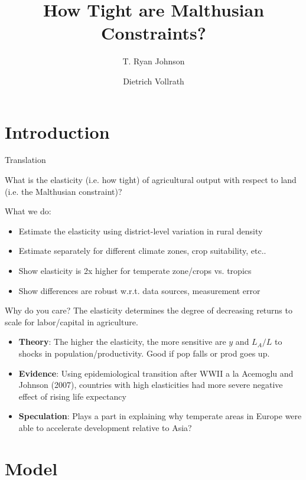 \documentclass[10pt, xcolor=dvipsnames]{beamer}
\title[Land Constraints]{{How Tight are Malthusian Constraints?}}
\author[Johnson \& Vollrath]{T. Ryan Johnson \inst{1} \and Dietrich Vollrath \inst{2}}
\institute[UH]{\inst{1} University of Houston \and %
                      \inst{2} University of Houston}
\date[June 2017]{}
\begin{document}
\maketitle

\section{Introduction}

\begin{frame}{Translation}\label{define}

What is the elasticity (i.e. how tight) of agricultural output with respect to land (i.e. the Malthusian constraint)? 

What we do: 
\begin{itemize}
  \item Estimate the elasticity using district-level variation in rural density
  \item Estimate separately for different climate zones, crop suitability, etc..
  \item Show elasticity is 2x higher for temperate zone/crops vs. tropics
  \item Show differences are robust w.r.t. data sources, measurement error
\end{itemize}


\end{frame}


\begin{frame}{Why do you care?}
The elasticity determines the degree of decreasing returns to scale for labor/capital in agriculture. 

\begin{itemize}
  \item \textbf{Theory}: The higher the elasticity, the more sensitive are $y$ and $L_A/L$ to shocks in population/productivity. Good if pop falls or prod goes up.
  \item \textbf{Evidence}: Using epidemiological transition after WWII a la Acemoglu and Johnson (2007), countries with high elasticities had more severe negative effect of rising life expectancy
  \item \textbf{Speculation}: Plays a part in explaining why temperate areas in Europe were able to accelerate development relative to Asia? 

\end{itemize}

\end{frame}

\section{Model}
\end{document}
